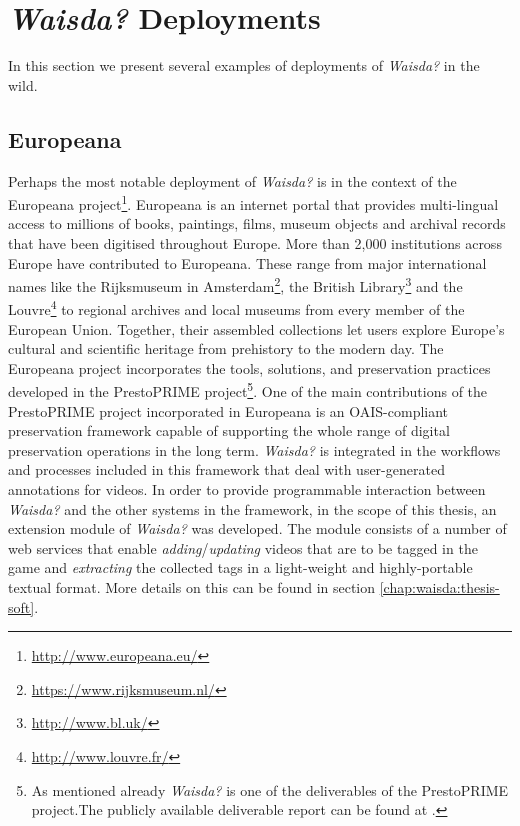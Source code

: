 \section{\textit{Waisda?} Deployments}
In this section we present several examples of deployments of \textit{Waisda?} in the wild.

\subsection{Europeana}\label{sec:waisda-europeana}
Perhaps the most notable deployment of \textit{Waisda?} is in the context of the Europeana project\footnote{\url{http://www.europeana.eu/}}. Europeana is an internet portal that provides multi-lingual access to millions of books, paintings, films, museum objects and archival records that have been digitised throughout Europe. More than 2,000 institutions across Europe have contributed to Europeana. These range from major international names like the Rijksmuseum in Amsterdam\footnote{\url{https://www.rijksmuseum.nl/}}, the British Library\footnote{\url{http://www.bl.uk/}} and the Louvre\footnote{\url{http://www.louvre.fr/}} to regional archives and local museums from every member of the European Union. Together, their assembled collections let users explore Europe's cultural and scientific heritage from prehistory to the modern day. The Europeana project incorporates the tools, solutions, and preservation practices developed in the PrestoPRIME project\footnote{As mentioned already \textit{Waisda?} is one of the deliverables of the PrestoPRIME project.The publicly available deliverable report can be found at \cite{prestoprime-report}.}. One of the main contributions of the PrestoPRIME project incorporated in Europeana is an OAIS-compliant preservation framework capable of supporting the whole range of digital preservation operations in the long term. \textit{Waisda?} is integrated in the workflows and processes included in this framework that deal with user-generated annotations for videos. In order to provide programmable interaction between \textit{Waisda?} and the other systems in the framework, in the scope of this thesis, an extension module of \textit{Waisda?} was developed. The module consists of a number of web services that enable \textit{adding}/\textit{updating} videos that are to be tagged in the game and \textit{extracting} the collected tags in a light-weight and highly-portable textual format. More details on this can be found in section \ref{chap:waisda:thesis-soft}.

